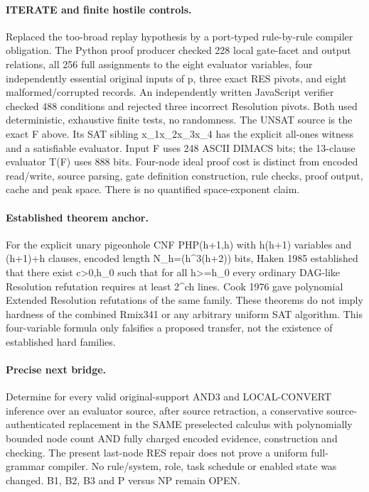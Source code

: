 \documentclass[11pt]{article}
\begin{document}
\paragraph{ITERATE and finite hostile controls.} Replaced the too-broad replay hypothesis by a port-typed rule-by-rule compiler obligation. The Python proof producer checked 228 local gate-facet and output relations, all 256 full assignments to the eight evaluator variables, four independently essential original inputs of p, three exact RES pivots, and eight malformed/corrupted records. An independently written JavaScript verifier checked 488 conditions and rejected three incorrect Resolution pivots. Both used deterministic, exhaustive finite tests, no randomness. The UNSAT source is the exact F above. Its SAT sibling x_1\land x_2\land x_3\land x_4 has the explicit all-ones witness and a satisfiable evaluator. Input F uses 248 ASCII DIMACS bits; the 13-clause evaluator T(F) uses 888 bits. Four-node ideal proof cost is distinct from encoded read/write, source parsing, gate definition construction, rule checks, proof output, cache and peak space. There is no quantified space-exponent claim.

\paragraph{Established theorem anchor.} For the explicit unary pigeonhole CNF PHP(h+1,h) with h(h+1) variables and (h+1)+h clauses, encoded length N_h=\Theta(h^3\log(h+2)) bits, Haken 1985 established that there exist c>0,h_0 such that for all h>=h_0 every ordinary DAG-like Resolution refutation requires at least 2^{ch} lines. Cook 1976 gave polynomial Extended Resolution refutations of the same family. These theorems do not imply hardness of the combined Rmix341 or any arbitrary uniform SAT algorithm. This four-variable formula only falsifies a proposed transfer, not the existence of established hard families.

\paragraph{Precise next bridge.} Determine for every valid original-support AND3 and LOCAL-CONVERT inference over an evaluator source, after source retraction, a conservative source-authenticated replacement in the SAME preselected calculus with polynomially bounded node count AND fully charged encoded evidence, construction and checking. The present last-node RES repair does not prove a uniform full-grammar compiler. No rule/system, role, task schedule or enabled state was changed. B1, B2, B3 and P versus NP remain OPEN.
\end{document}
